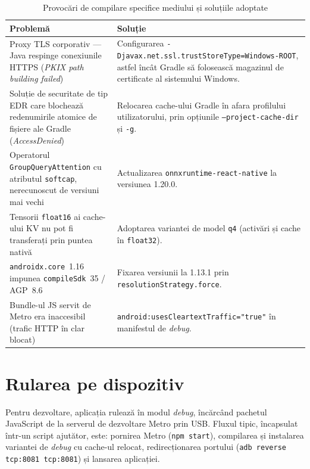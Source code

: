 \documentclass[12pt, a4paper, twoside]{report}
\numberwithin{equation}{section}
\begin{document}
\begin{table}[H]
\centering
\caption{Provocări de compilare specifice mediului și soluțiile adoptate}
\label{tab:build}
\footnotesize
\setlength{\tabcolsep}{4pt}
\begin{tabularx}{\textwidth}{>{\raggedright\arraybackslash}p{5cm}X}
\toprule
\textbf{Problemă} & \textbf{Soluție} \\
\midrule
Proxy TLS corporativ --- Java respinge conexiunile HTTPS (\textit{PKIX path building failed}) &
Configurarea \texttt{-Djavax.\allowbreak net.\allowbreak ssl.\allowbreak trustStoreType=\allowbreak Windows-ROOT}, astfel încât Gradle să
folosească magazinul de certificate al sistemului Windows. \\
Soluție de securitate de tip EDR care blochează redenumirile atomice de fișiere ale Gradle
(\textit{AccessDenied}) & Relocarea cache-ului Gradle în afara profilului utilizatorului, prin
opțiunile \texttt{--project-cache-dir} și \texttt{-g}. \\
Operatorul \texttt{GroupQueryAttention} cu atributul \texttt{softcap}, nerecunoscut de versiuni
mai vechi & Actualizarea \texttt{onnxruntime-react-native} la versiunea 1.20.0. \\
Tensorii \texttt{float16} ai cache-ului KV nu pot fi transferați prin puntea nativă &
Adoptarea variantei de model \texttt{q4} (activări și cache în \texttt{float32}). \\
\texttt{androidx.core}~1.16 impunea \texttt{compileSdk}~35 / AGP~8.6 & Fixarea versiunii la
1.13.1 prin \texttt{resolutionStrategy.force}. \\
Bundle-ul JS servit de Metro era inaccesibil (trafic HTTP în clar blocat) &
\texttt{android:\allowbreak usesCleartextTraffic="true"} în manifestul de \textit{debug}. \\
\bottomrule
\end{tabularx}
\end{table}

\section{Rularea pe dispozitiv}

Pentru dezvoltare, aplicația rulează în modul \textit{debug}, încărcând pachetul JavaScript de
la serverul de dezvoltare Metro prin USB. Fluxul tipic, încapsulat într-un script ajutător, este:
pornirea Metro (\texttt{npm start}), compilarea și instalarea variantei de \textit{debug} cu
cache-ul relocat, redirecționarea portului (\texttt{adb reverse tcp:8081 tcp:8081}) și lansarea
aplicației.
\end{document}
